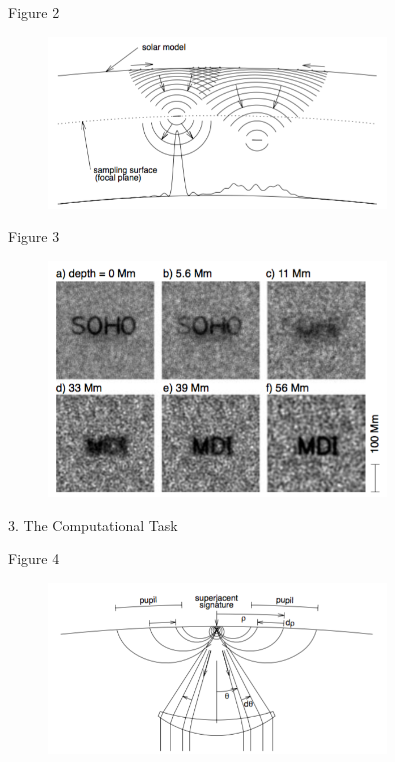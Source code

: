 \documentclass{beamer}
\begin{document}
\begin{frame}{Figure 2}
    \begin{figure}
        \includegraphics[width=0.8\textwidth]{fig_2.png}
    \end{figure}
\end{frame}

\begin{frame}{Figure 3}
    \begin{figure}
        \includegraphics[width=0.8\textwidth]{fig_3.png}
    \end{figure}
\end{frame}

\begin{frame}{3. The Computational Task}
\end{frame}

\begin{frame}{Figure 4}
    \begin{figure}
        \includegraphics[width=0.8\textwidth]{fig_4.png}
    \end{figure}
\end{frame}
\end{document}
